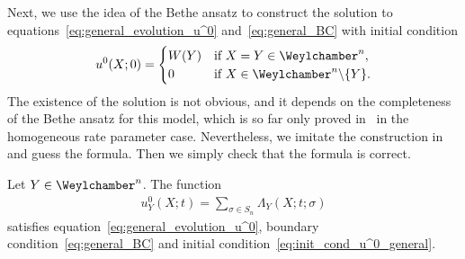 Next, we use the idea of the Bethe ansatz to construct the solution to equations~\eqref{eq:general_evolution_u^0} and~\eqref{eq:general_BC} with initial condition
\begin{gather} \label{eq:init_cond_u^0_general}
 u^0(X; 0) =
 \begin{cases}
 W(Y) & \text{if $X = Y \in \Weylchamber^n$}, \\
 0 & \text{if $X \in \Weylchamber^n {\setminus} \{ Y \}$}.
 \end{cases}
\end{gather}
The existence of the solution is not obvious, and it depends on the completeness of the Bethe ansatz for this model, which is so far only proved in~\cite{Borodin-Corwin-Petrov-Sasamoto15} in the homogeneous rate parameter case. Nevertheless, we imitate the construction in~\cite{Korhonen-Lee14} and guess the formula. Then we simply check that the formula is correct.

\begin{Lemma} \label{lem:Bethe_ansatz_solution}
 Let $Y \in \Weylchamber^n$. The function
 \begin{gather*}
 u^0_Y(X; t) = \sum_{\sigma \in S_n} \Lambda_Y(X; t; \sigma)
 \end{gather*}
 satisfies equation~\eqref{eq:general_evolution_u^0}, boundary condition~\eqref{eq:general_BC} and initial condition~\eqref{eq:init_cond_u^0_general}.
\end{Lemma}

